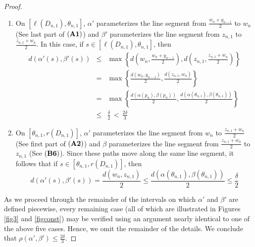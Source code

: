 \documentclass[10pt,a4paper]{amsart}
\begin{document}
\begin{proof}
\begin{enumerate}
    \item On $[\ell(D_{n,1}),\theta_{n,1}]$, $\alpha '$ parameterizes the line segment from $\frac{w_n+y_{n-1}}{2}$ to $w_n$  (See last part of $\bf (A1)$) and $\beta '$ parameterizes the line segment from $z_{n,1}$ to $\frac{z_{n,1}+w_n}{2}$. In this case, if $s\in [\ell(D_{n,1}),\theta_{n,1}]$, then
    \begin{eqnarray*}
    d(\alpha '(s),\beta '(s)) &\leq&  \max\left\{ d\left(w_n,\frac{w_n+y_{n-1}}{2}\right),d\left(z_{n,1},\frac{z_{n,1}+w_n}{2}\right)\right\}\\
    &=& \max\left\{\frac{ d(w_n,y_{n-1})}{2},\frac{d(z_{n,1},w_n)}{2}\right\}\\
    &=& \max\left\{\frac{ d(\alpha(p_n),\beta(p_n))}{2},\frac{d(\alpha(\theta_{n,1}),\beta(\theta_{n,1}))}{2}\right\}\\
    & \leq & \frac{\delta}{2} \,<\, \frac{2\delta}{3}
    \end{eqnarray*}

    \item On $[\theta_{n,1},r(D_{n,1})]$, $\alpha '$ parameterizes the line segment from $w_n$ to $\frac{z_{n,1}+w_n}{2}$  (See first part of $\bf (A2)$) and $\beta$ parameterizes the line segment from $\frac{z_{n,1}+w_n}{2}$ to $z_{n,1}$  (See $\bf (B6)$). Since these paths move along the same line segment, it follows that if $s\in [\theta_{n,1},r(D_{n,1})]$, then \[d(\alpha '(s),\beta '(s))=\frac{d(w_n,z_{n,1})}{2}\leq \frac{d(\alpha(\theta_{n,1}),\beta(\theta_{n,1}))}{2}\leq \frac{\delta}{2}\]
\end{enumerate}

As we proceed through the remainder of the intervals on which $\alpha '$ and $\beta '$ are defined piecewise, every remaining case (all of which are illustrated in Figures \ref{fig3} and \ref{figconst}) may be verified using an argument nearly identical to one of the above five cases. Hence, we omit the remainder of the details. We conclude that $\rho(\alpha',\beta')\leq \frac{2\delta}{3}$.
\end{proof}
\end{document}
